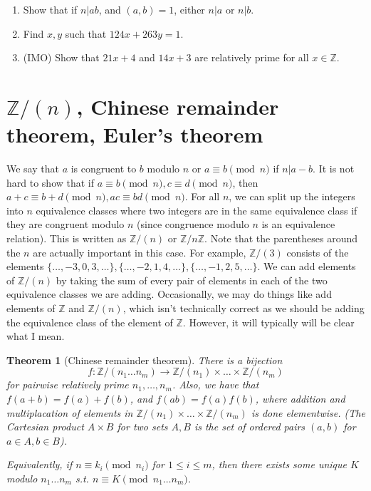 \documentclass{article}
\theoremstyle{plain}
\newtheorem{theorem}{Theorem}
\numberwithin{equation}{section}
\begin{document}
\begin{enumerate}
\item Show that if $n|ab$, and $(a, b) = 1$, either $n|a$ or $n|b$.
\item Find $x, y$ such that $124x + 263y = 1$.
\item (IMO) Show that $21x + 4$ and $14x + 3$ are relatively prime for all $x\in\mathbb{Z}.$
\end{enumerate}

\section*{$\mathbb{Z}/(n)$, Chinese remainder theorem, Euler's theorem}

We say that $a$ is congruent to $b$ modulo $n$ or $a\equiv b\pmod{n}$ if $n|a - b$. It is not hard to show that if 
$a\equiv b\pmod{n}, c\equiv d\pmod{n}$, then $a + c\equiv b + d\pmod{n}, ac\equiv bd\pmod{n}.$ For all $n$, we can split 
up the integers into $n$ equivalence classes where two integers are in the same equivalence class if they are congruent
modulo $n$ (since congruence modulo $n$ is an equivalence relation). This is written as $\mathbb{Z}/(n)$ or $\mathbb{Z}/n\mathbb{Z}$.
Note that the parentheses around the $n$ are actually important in this case. For example, $\mathbb{Z}/(3)$ consists of 
the elements $\{\dots, -3, 0, 3, \dots\}, \{\dots, -2, 1, 4, \dots\}, \{\dots, -1, 2, 5, \dots\}$. We can add elements of 
$\mathbb{Z}/(n)$ by taking the sum of every pair of elements in each of the two equivalence classes we are adding. Occasionally, we 
may do things like add elements of $\mathbb{Z}$ and $\mathbb{Z}/(n)$, which isn't technically correct as we should be adding the 
equivalence class of the element of $\mathbb{Z}$. However, it will typically will be clear what I mean.

\begin{theorem}[Chinese remainder theorem]
There is a bijection $$f:\mathbb{Z}/(n_1\dots n_m)\rightarrow \mathbb{Z}/(n_1)\times\dots\times\mathbb{Z}/(n_m)$$ for pairwise 
relatively prime $n_1, \dots, n_m$. Also, we have that $f(a + b) = f(a) + f(b)$, and $f(ab) = f(a)f(b)$, where addition and
multiplacation of elements in $\mathbb{Z}/(n_1)\times\dots\times\mathbb{Z}/(n_m)$ is done elementwise. 
(The Cartesian product $A\times B$ for two sets $A, B$ is the set of ordered pairs $(a, b)$ for $a\in A, b\in B$).

Equivalently, if $n\equiv k_i\pmod{n_i}$ for $1 \le i\le m$, then there exists some unique $K$ modulo $n_1\dots n_m$ s.t. 
$n\equiv K\pmod{n_1\dots n_m}$.
\end{theorem}
\end{document}
